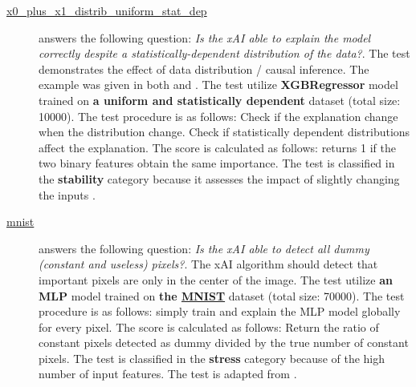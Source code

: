 \begin{description}
\item[\href{Compare-xAI/tree/main/tests/x0_plus_x1.py}{x0\_plus\_x1\_distrib\_uniform\_stat\_dep}] answers the following question: \emph{Is the xAI able to explain the model correctly despite a statistically-dependent distribution of the data?}.
The test demonstrates the effect of data distribution / causal inference. The example was given in both \citep{hooker2021unrestricted} and \citep{janzing2020feature}.
 The test utilize \textbf{XGBRegressor} model trained on \textbf{a uniform and statistically dependent} dataset (total size: 10000).
 The test procedure is as follows: Check if the explanation change when the distribution change. Check if statistically dependent distributions affect the explanation.
 The score is calculated as follows: returns 1 if the two binary features obtain the same importance.
 The test is classified in the \textbf{stability} category because it assesses the impact of slightly changing the inputs \citep{janzing2020feature}.


\item[\href{Compare-xAI/tree/main/tests/mnist.py}{mnist}] answers the following question: \emph{Is the xAI able to detect all dummy (constant and useless) pixels?}.
The xAI algorithm should detect that important pixels are only in the center of the image.
 The test utilize \textbf{an MLP} model trained on \textbf{the \href{https://www.openml.org/d/554}{MNIST}} dataset (total size: 70000).
 The test procedure is as follows: simply train and explain the MLP model globally for every pixel.
 The score is calculated as follows: Return the ratio of constant pixels detected as dummy divided by the true number of constant pixels.
 The test is classified in the \textbf{stress} category because of the high number of input features. The test is adapted from \citep{covert2020understanding}.



\end{description}
